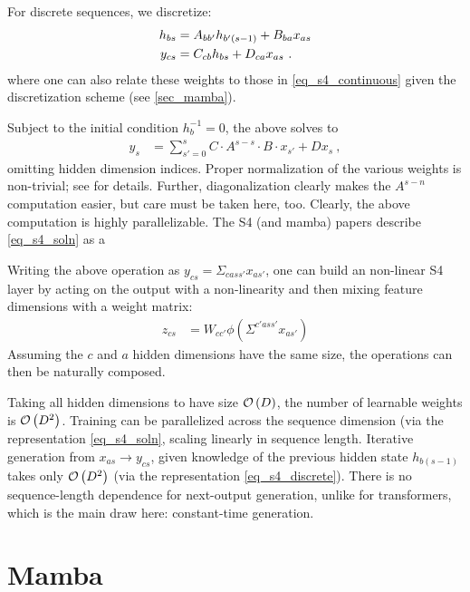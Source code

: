 \documentclass[11pt]{article}
\begin{document}
For discrete sequences, we discretize:
\begin{align}
    h  _{ bs } &= A  _{ b b' }h _{ b' (s-1) } + B  _{ b a }x  _{ as }\nonumber\\
    y  _{ cs } &= C _{ c b }h  _{ bs } + D _{ c a }x  _{ as } \label{eq_s4_discrete} \ .
\end{align}
where one can also relate these weights to those in \eqref{eq_s4_continuous} given the
discretization scheme (see \ref{sec_mamba}).

Subject to the initial condition $ h _{ b } ^{ -1 } =0 $, the above solves to
\begin{align}
    y _{ s }   &= \sum _{ s'=0 } ^{ s }  C \cdot  A ^{ s - s } \cdot B \cdot  x _{ s' } + D x _{ s }  \ , \label{eq_s4_soln}
\end{align}
omitting hidden dimension indices. Proper normalization of the various weights is non-trivial; see
\cite{s4} for details. Further, diagonalization clearly makes the $ A ^{ s-n } $ computation easier,
but care must be taken here, too. Clearly, the above computation is highly parallelizable. The S4
(and mamba) papers describe \eqref{eq_s4_soln} as a

Writing the above operation as $ y _{cs }   = \Sigma _{ca s s' } x _{ as' } $, one can build an
non-linear S4 layer by acting on the output with a non-linearity and then mixing feature dimensions
with a weight matrix:
\begin{align}
     z  _{ cs }  &= W _{ c c' } \phi \left ( \Sigma ^{c'a s s' } x _{ as' } \right ) \label{eq_s4_layer}
\end{align}
Assuming the $ c  $ and $ a  $ hidden dimensions have the same size, the operations can then be
naturally composed.

Taking all hidden dimensions to have size $ \mathcal{O} \left( D \right)  $, the number of learnable
weights is $ \mathcal{O} \left( D ^{ 2 }  \right)  $. Training can be parallelized across the sequence
dimension (via the representation \eqref{eq_s4_soln}, scaling linearly in sequence length. Iterative
generation from $ x _{ as } \longrightarrow y _{ cs }  $, given knowledge of the previous hidden
state $ h _{ b (s-1) }  $ takes only $ \mathcal{O} \left( D ^{ 2 } \right)  $ (via the representation
\eqref{eq_s4_discrete}). There is no sequence-length dependence for next-output generation, unlike
for transformers, which is the main draw here: constant-time generation.

\section{Mamba\label{sec_mamba}}
\end{document}
